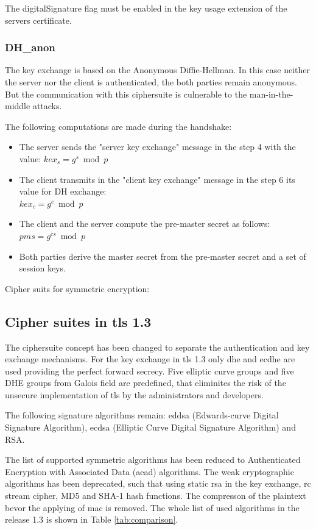 The digitalSignature flag must be enabled in the key usage extension of the servers certificate.

\subsubsection*{DH\_anon}
The key exchange is based on the Anonymous Diffie-Hellman. In this case neither the server nor the client is authenticated, the both parties remain anonymous. But the communication with this ciphersuite is culnerable to the man-in-the-middle attacks.

The following computations are made during the handshake:
\begin{itemize}
	\item The server sends the "server key exchange" message in the step 4 with the value: $\displaystyle kex_s = g^s \bmod p $ 
	\item The client transmits in the "client key exchange" message in the step 6 its value for DH exchange: \\ $\displaystyle kex_c = g^c \bmod p $ 
	\item The client and the server compute the pre-master secret as follows: $\displaystyle pms = g^{cs} \bmod p$
	\item Both parties derive the master secret from the pre-master secret and a set of session keys.
\end{itemize}


Cipher suits for symmetric encryption:



\subsection{Cipher suites in \gls{tls} 1.3}
\label{subsec:ciphersuits1_3}

The ciphersuite concept has been changed to separate the authentication and key exchange mechanisms.
For the key exchange in \gls{tls} 1.3 only \gls{dhe} and \gls{ecdhe} are used providing the perfect forward secrecy. Five elliptic curve groups and five DHE groups from Galois field are predefined, that eliminites the risk of the unsecure implementation of \gls{tls} by the administrators and developers.

The following signature algorithms remain: \gls{eddsa} (Edwards-curve Digital Signature Algorithm),
\gls{ecdsa} (Elliptic Curve Digital Signature Algorithm) and RSA.

The list of supported symmetric algorithms has been reduced to Authenticated Encryption with Associated Data (\gls{aead}) algorithms.
The weak cryptographic algorithms has been deprecated, such that using static \gls{rsa} in the key exchange, \gls{rc} stream cipher, MD5 and SHA-1 hash functions. The compresson of the plaintext bevor the applying of \gls{mac} is removed.
The whole list of used algorithms in the release 1.3 is shown in Table \ref{tab:comparison}.

